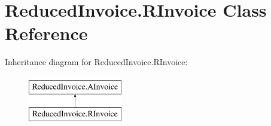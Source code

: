 \hypertarget{class_reduced_invoice_1_1_r_invoice}{}\section{Reduced\+Invoice.\+R\+Invoice Class Reference}
\label{class_reduced_invoice_1_1_r_invoice}
Inheritance diagram for Reduced\+Invoice.\+R\+Invoice\+:\begin{figure}[H]
\begin{center}
\leavevmode
\includegraphics[height=2.000000cm]{class_reduced_invoice_1_1_r_invoice}
\end{center}
\end{figure}
